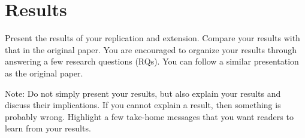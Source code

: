 
\section{Results}
\label{sec:results}

Present the results of your replication and extension. Compare your results with that in the original paper. You are encouraged to organize your results through answering a few research questions (RQs). You can follow a similar presentation as the original paper. 

Note: Do not simply present your results, but also explain your results and discuss their implications. If you cannot explain a result, then something is probably wrong. Highlight a few take-home messages that you want readers to learn from your results.

